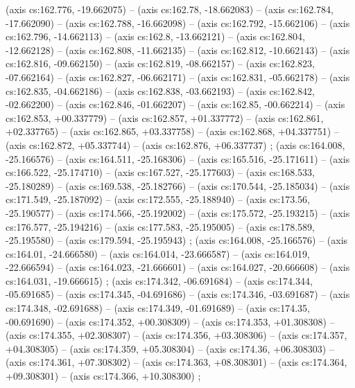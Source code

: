     (axis cs:162.776,    -19.662075) --  (axis cs:162.78,    -18.662083) --  (axis cs:162.784,    -17.662090) --  (axis cs:162.788,    -16.662098) --  (axis cs:162.792,    -15.662106) --  (axis cs:162.796,    -14.662113) --  (axis cs:162.8,    -13.662121) --  (axis cs:162.804,    -12.662128) --  (axis cs:162.808,    -11.662135) --  (axis cs:162.812,    -10.662143) --  (axis cs:162.816,    -09.662150) --  (axis cs:162.819,    -08.662157) --  (axis cs:162.823,    -07.662164) --  (axis cs:162.827,    -06.662171) --  (axis cs:162.831,    -05.662178) --  (axis cs:162.835,    -04.662186) --  (axis cs:162.838,    -03.662193) --  (axis cs:162.842,    -02.662200) --  (axis cs:162.846,    -01.662207) --  (axis cs:162.85,    -00.662214) --  (axis cs:162.853,    +00.337779) --  (axis cs:162.857,    +01.337772) --  (axis cs:162.861,    +02.337765) --  (axis cs:162.865,    +03.337758) --  (axis cs:162.868,    +04.337751) --  (axis cs:162.872,    +05.337744) --  (axis cs:162.876,    +06.337737) ;
    (axis cs:164.008,    -25.166576) --  (axis cs:164.511,    -25.168306) --  (axis cs:165.516,    -25.171611) --  (axis cs:166.522,    -25.174710) --  (axis cs:167.527,    -25.177603) --  (axis cs:168.533,    -25.180289) --  (axis cs:169.538,    -25.182766) --  (axis cs:170.544,    -25.185034) --  (axis cs:171.549,    -25.187092) --  (axis cs:172.555,    -25.188940) --  (axis cs:173.56,    -25.190577) --  (axis cs:174.566,    -25.192002) --  (axis cs:175.572,    -25.193215) --  (axis cs:176.577,    -25.194216) --  (axis cs:177.583,    -25.195005) --  (axis cs:178.589,    -25.195580) --  (axis cs:179.594,    -25.195943) ;
    (axis cs:164.008,    -25.166576) --  (axis cs:164.01,    -24.666580) --  (axis cs:164.014,    -23.666587) --  (axis cs:164.019,    -22.666594) --  (axis cs:164.023,    -21.666601) --  (axis cs:164.027,    -20.666608) --  (axis cs:164.031,    -19.666615) ;
    (axis cs:174.342,    -06.691684) --  (axis cs:174.344,    -05.691685) --  (axis cs:174.345,    -04.691686) --  (axis cs:174.346,    -03.691687) --  (axis cs:174.348,    -02.691688) --  (axis cs:174.349,    -01.691689) --  (axis cs:174.35,    -00.691690) --  (axis cs:174.352,    +00.308309) --  (axis cs:174.353,    +01.308308) --  (axis cs:174.355,    +02.308307) --  (axis cs:174.356,    +03.308306) --  (axis cs:174.357,    +04.308305) --  (axis cs:174.359,    +05.308304) --  (axis cs:174.36,    +06.308303) --  (axis cs:174.361,    +07.308302) --  (axis cs:174.363,    +08.308301) --  (axis cs:174.364,    +09.308301) --  (axis cs:174.366,    +10.308300) ;
